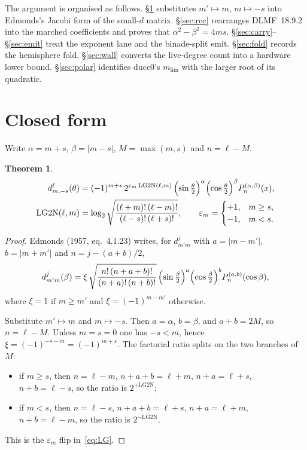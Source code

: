 \documentclass[11pt,a4paper]{article}
\newtheorem{theorem}{Theorem}[section]
\newcommand{\LG}{\mathrm{LG2N}}
\newcommand{\mlim}{m_{\mathrm{lim}}}
\numberwithin{equation}{section}
\begin{document}
The argument is organised as follows.  \S\ref{sec:closed} substitutes
$m'\mapsto m$, $m\mapsto -s$ into Edmonds's Jacobi form of the small-$d$
matrix.  \S\ref{sec:rec} rearranges DLMF~18.9.2 into the marched coefficients
and proves that $\alpha^2-\beta^2=4ms$.  \S\ref{sec:carry}--\S\ref{sec:emit}
treat the exponent lane and the binade-split emit.  \S\ref{sec:fold} records
the hemisphere fold.  \S\ref{sec:wall} converts the live-degree count into a
hardware lower bound.  \S\ref{sec:polar} identifies ducc0's $\mlim$ with the
larger root of its quadratic.

\section{Closed form}
\label{sec:closed}

Write $\alpha=m+s$, $\beta=\lvert m-s\rvert$, $M=\max(m,s)$ and $n=\ell-M$.

\begin{theorem}
\label{thm:closed}
\begin{align}
d^\ell_{m,-s}(\theta)
  &=(-1)^{m+s}\,
    2^{\varepsilon_m\,\LG(\ell,m)}\,
    \Bigl(\sin\tfrac{\theta}{2}\Bigr)^\alpha
    \Bigl(\cos\tfrac{\theta}{2}\Bigr)^\beta
    P_n^{(\alpha,\beta)}(x),
\label{eq:d}
\\
\LG(\ell,m)
  &=\log_2\sqrt{\frac{(\ell+m)!\,(\ell-m)!}{(\ell-s)!\,(\ell+s)!}},
  \qquad
  \varepsilon_m
  =
  \begin{cases}
    +1,& m\ge s,\\
    -1,& m<s.
  \end{cases}
\label{eq:LG}
\end{align}
\end{theorem}

\begin{proof}
Edmonds (1957, eq.~4.1.23) writes, for $d^j_{m'm}$ with
$a=\lvert m-m'\rvert$, $b=\lvert m+m'\rvert$ and $n=j-(a+b)/2$,
\begin{equation}
\label{eq:edmonds}
d^j_{m'm}(\beta)
  =\xi\,
   \sqrt{\frac{n!\,(n+a+b)!}{(n+a)!\,(n+b)!}}\,
   \Bigl(\sin\tfrac{\beta}{2}\Bigr)^a
   \Bigl(\cos\tfrac{\beta}{2}\Bigr)^b
   P_n^{(a,b)}(\cos\beta),
\end{equation}
where $\xi=1$ if $m\ge m'$ and $\xi=(-1)^{m-m'}$ otherwise.

Substitute $m'\mapsto m$ and $m\mapsto -s$.  Then $a=\alpha$, $b=\beta$,
and $a+b=2M$, so $n=\ell-M$.  Unless $m=s=0$ one has $-s<m$, hence
$\xi=(-1)^{-s-m}=(-1)^{m+s}$.  The factorial ratio splits on the two
branches of $M$:
\begin{itemize}
\item if $m\ge s$, then $n=\ell-m$, $n+a+b=\ell+m$, $n+a=\ell+s$,
$n+b=\ell-s$, so the ratio is $2^{+\LG}$;
\item if $m<s$, then $n=\ell-s$, $n+a+b=\ell+s$, $n+a=\ell+m$,
$n+b=\ell-m$, so the ratio is $2^{-\LG}$.
\end{itemize}
This is the $\varepsilon_m$ flip in~\eqref{eq:LG}.
\end{proof}
\end{document}
